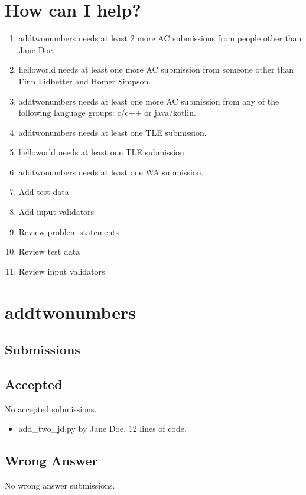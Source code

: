 \documentclass{article}%
\begin{document}
\section{How can I help?}%
\label{sec:HowcanIhelp?}%
\begin{enumerate}%
\item%
addtwonumbers needs at least 2 more AC submissions from people other than Jane Doe.%
\item%
helloworld needs at least one more AC submission from someone other than Finn Lidbetter and Homer Simpson.%
\item%
addtwonumbers needs at least one more AC submission from any of the following language groups: c/c++ or java/kotlin.%
\item%
addtwonumbers needs at least one TLE submission.%
\item%
helloworld needs at least one TLE submission.%
\item%
addtwonumbers needs at least one WA submission.%
\item%
Add test data%
\item%
Add input validators%
\item%
Review problem statements%
\item%
Review test data%
\item%
Review input validators%
\end{enumerate}

%
\newpage%
\section{addtwonumbers}%
\label{sec:addtwonumbers}%
\subsection{Submissions}%
\label{subsec:Submissions}%
\subsection{Accepted}%
\label{subsec:Accepted}%
No accepted submissions.%
\begin{itemize}%
\item%
add\_two\_jd.py by Jane Doe. 12 lines of code.%
\end{itemize}

%
\subsection{Wrong Answer}%
\label{subsec:WrongAnswer}%
No wrong answer submissions.%
\end{document}
